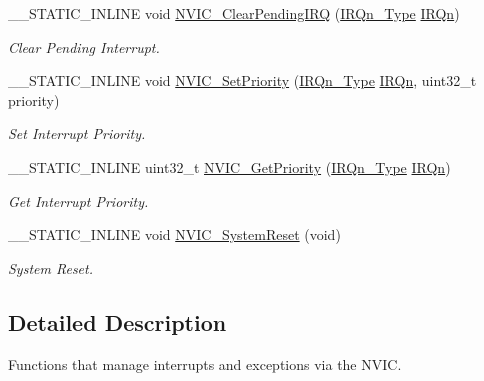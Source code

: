 \begin{DoxyCompactItemize}
\+\_\+\+\_\+\+S\+T\+A\+T\+I\+C\+\_\+\+I\+N\+L\+I\+N\+E void \hyperlink{group___c_m_s_i_s___core___n_v_i_c_functions_ga332e10ef9605dc6eb10b9e14511930f8}{N\+V\+I\+C\+\_\+\+Clear\+Pending\+I\+R\+Q} (\hyperlink{group___s_a_m_l21_e18_a__cmsis_gac3af4a32370fb28c4ade8bf2add80251}{I\+R\+Qn\+\_\+\+Type} \hyperlink{group___s_a_m_l21_e18_a__cmsis_ga666eb0caeb12ec0e281415592ae89083}{I\+R\+Qn})
\begin{DoxyCompactList}\small\item\em Clear Pending Interrupt. \end{DoxyCompactList}\item 
\+\_\+\+\_\+\+S\+T\+A\+T\+I\+C\+\_\+\+I\+N\+L\+I\+N\+E void \hyperlink{group___c_m_s_i_s___core___n_v_i_c_functions_ga2305cbd44aaad792e3a4e538bdaf14f9}{N\+V\+I\+C\+\_\+\+Set\+Priority} (\hyperlink{group___s_a_m_l21_e18_a__cmsis_gac3af4a32370fb28c4ade8bf2add80251}{I\+R\+Qn\+\_\+\+Type} \hyperlink{group___s_a_m_l21_e18_a__cmsis_ga666eb0caeb12ec0e281415592ae89083}{I\+R\+Qn}, uint32\+\_\+t priority)
\begin{DoxyCompactList}\small\item\em Set Interrupt Priority. \end{DoxyCompactList}\item 
\+\_\+\+\_\+\+S\+T\+A\+T\+I\+C\+\_\+\+I\+N\+L\+I\+N\+E uint32\+\_\+t \hyperlink{group___c_m_s_i_s___core___n_v_i_c_functions_ga1cbaf8e6abd4aa4885828e7f24fcfeb4}{N\+V\+I\+C\+\_\+\+Get\+Priority} (\hyperlink{group___s_a_m_l21_e18_a__cmsis_gac3af4a32370fb28c4ade8bf2add80251}{I\+R\+Qn\+\_\+\+Type} \hyperlink{group___s_a_m_l21_e18_a__cmsis_ga666eb0caeb12ec0e281415592ae89083}{I\+R\+Qn})
\begin{DoxyCompactList}\small\item\em Get Interrupt Priority. \end{DoxyCompactList}\item 
\+\_\+\+\_\+\+S\+T\+A\+T\+I\+C\+\_\+\+I\+N\+L\+I\+N\+E void \hyperlink{group___c_m_s_i_s___core___n_v_i_c_functions_ga1143dec48d60a3d6f238c4798a87759c}{N\+V\+I\+C\+\_\+\+System\+Reset} (void)
\begin{DoxyCompactList}\small\item\em System Reset. \end{DoxyCompactList}\end{DoxyCompactItemize}


\subsection{Detailed Description}
Functions that manage interrupts and exceptions via the N\+V\+I\+C. 



